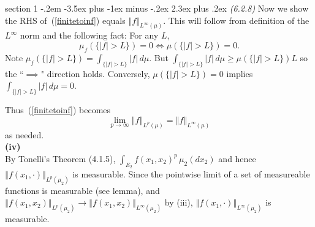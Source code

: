 \documentclass[12pt]{article}
\makeatletter
\theoremstyle{norm}
\newcommand{\Z}[0]{\mathbb{Z}}
\newcommand{\rc}[1]{\frac{1}{#1}}
\newcommand{\pa}[1]{\left( {#1} \right)}
\newcommand{\ve}[1]{\left\Vert {#1}\right\Vert}
\newcommand{\subprob}[1]{\noindent\textbf{#1}\\}
\newcommand{\iy}[0]{\infty}
\newenvironment{problem}{\@startsection
       {section}
       {1}
       {-.2em}
       {-3.5ex plus -1ex minus -.2ex}
       {2.3ex plus .2ex}
       {\pagebreak[3]%
       \large\bf\noindent{Problem }
       }
       }
       {%
       }
\makeatother
\begin{document}
\begin{problem}{\it (6.2.8)}
Now we show the RHS of~(\ref{finitetoinf}) equals $\ve{f}_{L^{\iy}(\mu)}$. This will follow from definition of the $L^{\iy}$ norm and the following fact: For any $L$,
\[
\mu_f(\{|f|>L\})=0\iff \mu(\{|f|>L\})=0.
\]
Note $\mu_f(\{|f|>L\})=\int_{\{|f|>L\}} |f|\,d\mu$. But $\int_{\{|f|>L\}}|f|\,d\mu\ge \mu(\{|f|>L\})L$ so the ``$\implies$" direction holds. Conversely, $\mu(\{|f|>L\})=0$ implies $\int_{\{|f|>L\}} |f|\,d\mu=0$.

Thus~(\ref{finitetoinf}) becomes
\[
\lim_{p\to\iy} \ve{f}_{L^p(\mu)}=\ve{f}_{L^{\iy}(\mu)}
\]
as needed. \\

%

\subprob{(iv)}
By Tonelli's Theorem (4.1.5), $\int_{E_2} f(x_1,x_2)^p\,\mu_2(dx_2)$ and hence $\ve{f(x_1,\cdot)}_{L^{p}(\mu_2)}$ is measurable. Since the pointwise limit of a set of measureable functions is measurable (see lemma), and $\ve{f(x_1,x_2)}_{L^{p}(\mu_2)}\to \ve{f(x_1,x_2)}_{L^{\iy}(\mu_2)}$ by (iii), $\ve{f(x_1,\cdot)}_{L^{\iy}(\mu_2)}$ is measurable.


\end{problem}
\end{document}
